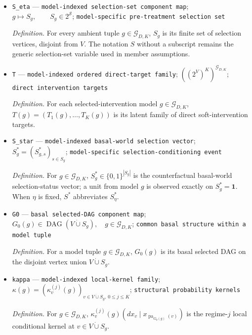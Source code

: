 \documentclass{article}
\begin{document}
\begin{itemize}
  \item \texttt{S\_\allowbreak{}eta} --- \texttt{model-\allowbreak{}indexed selection-\allowbreak{}set component map}; \(g\mapsto S_g,\qquad S_g\in 2^{\mathcal S}\); \texttt{model-\allowbreak{}specific pre-\allowbreak{}treatment selection set}
  \par\smallskip\noindent\emph{Definition.} For every ambient tuple \(g\in\mathcal G_{D,K}\), \(S_g\) is its finite set of selection vertices, disjoint from \(V\). The notation \(S\) without a subscript remains the generic selection-set variable used in member assumptions.
  \item \texttt{T} --- \texttt{model-\allowbreak{}indexed ordered direct-\allowbreak{}target family}; \(((2^V)^K)^{\mathcal G_{D,K}}\); \texttt{direct intervention targets}
  \par\smallskip\noindent\emph{Definition.} For each selected-intervention model \(g\in\mathcal G_{D,K}\), \(T(g)=(T_1(g),\ldots,T_K(g))\) is its latent family of direct soft-intervention targets.
  \item \texttt{S\_\allowbreak{}star} --- \texttt{model-\allowbreak{}indexed basal-\allowbreak{}world selection vector}; \(S_g^*=(S_{g,s}^*)_{s\in S_g}\); \texttt{model-\allowbreak{}specific selection-\allowbreak{}conditioning event}
  \par\smallskip\noindent\emph{Definition.} For \(g\in\mathcal G_{D,K}\), \(S_g^*\in\{0,1\}^{|S_g|}\) is the counterfactual basal-world selection-status vector; a unit from model \(g\) is observed exactly on \(S_g^*=\mathbf 1\). When \(\eta\) is fixed, \(S^*\) abbreviates \(S_\eta^*\).
  \item \texttt{G0} --- \texttt{basal selected-\allowbreak{}DAG component map}; \(G_0(g)\in\operatorname{DAG}(V\dot\cup S_g),\quad g\in\mathcal G_{D,K}\); \texttt{common basal structure within a model tuple}
  \par\smallskip\noindent\emph{Definition.} For a model tuple \(g\in\mathcal G_{D,K}\), \(G_0(g)\) is its basal selected DAG on the disjoint vertex union \(V\dot\cup S_g\).
  \item \texttt{kappa} --- \texttt{model-\allowbreak{}indexed local-\allowbreak{}kernel family}; \(\kappa(g)=(\kappa_v^{(j)}(g))_{v\in V\dot\cup S_g,\ 0\le j\le K}\); \texttt{structural probability kernels}
  \par\smallskip\noindent\emph{Definition.} For \(g\in\mathcal G_{D,K}\), \(\kappa_v^{(j)}(g)(dx_v\mid x_{\operatorname{pa}_{G_0(g)}(v)})\) is the regime-\(j\) local conditional kernel at \(v\in V\dot\cup S_g\).

\end{itemize}
\end{document}
